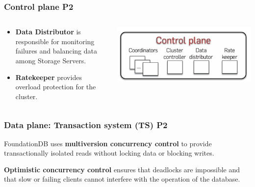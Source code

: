 \begin{frame}
    \frametitle{Control plane P2}
    \begin{columns}
        \begin{column}{0.5\textwidth}
        \begin{itemize}
        \item \textbf{Data Distributor} is responsible for monitoring failures and balancing data among Storage Servers.
        \item \textbf{Ratekeeper} provides overload protection for the cluster.
        \end{itemize}
        
        \end{column}
        \begin{column}{0.5\textwidth}
            \centering
            \includegraphics[width=\textwidth]{img/2-Architecture/Control plane.png}
        \end{column}
    \end{columns}
\end{frame}


\begin{frame}
	\frametitle{Data plane: Transaction system (TS) P2}

FoundationDB uses \textbf{multiversion concurrency control} to provide transactionally isolated reads without locking data or blocking writes.
\vspace{0.5cm}

\textbf{Optimistic concurrency control} ensures that deadlocks are impossible and that slow or failing clients cannot interfere with the operation of the database.
	
\end{frame}


